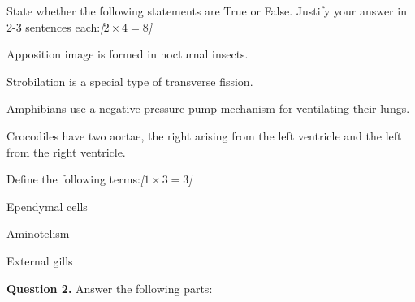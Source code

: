 \documentclass[11pt,a4paper]{article}
\newcommand{\pts}[1]{\hfill   \textit{[#1]}}
\begin{document}
\begin{parts}
  \item State whether the following statements are True or False. Justify your answer in 2-3 sentences each:\pts{$2  \times 4 = 8$}
  
\begin{parts}
    \item Apposition image is formed in nocturnal insects.
    \item Strobilation is a special type of transverse fission.
    \item Amphibians use a negative pressure pump mechanism for ventilating their lungs.
    \item Crocodiles have two aortae, the right arising from the left ventricle and the left from the right ventricle.
  \end{parts}
  \item Define the following terms:\pts{$1  \times 3 = 3$}
  
\begin{parts}
    \item Ependymal cells
    \item Aminotelism
    \item External gills
  \end{parts}
\end{parts}

\medskip


\noindent   \textbf{Question 2.} Answer the following parts:
\end{document}

